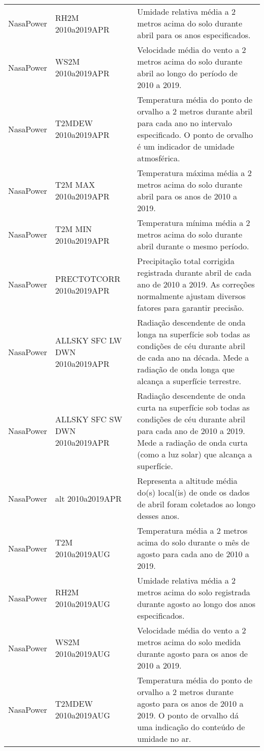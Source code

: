 \begin{longtable}{@{} p{4cm} p{4cm} p{8cm} @{}}
	NasaPower &
	RH2M 2010a2019APR &
	Umidade relativa média a 2 metros acima do solo durante abril para os anos especificados. \\
	NasaPower &
	WS2M 2010a2019APR &
	Velocidade média do vento a 2 metros acima do solo durante abril ao longo do período de 2010 a 2019. \\
	NasaPower &
	T2MDEW 2010a2019APR &
	Temperatura média do ponto de orvalho a 2 metros durante abril para cada ano no intervalo especificado. O ponto de orvalho é um indicador de umidade atmosférica. \\
	NasaPower &
	T2M MAX 2010a2019APR &
	Temperatura máxima média a 2 metros acima do solo durante abril para os anos de 2010 a 2019. \\
	NasaPower &
	T2M MIN 2010a2019APR &
	Temperatura mínima média a 2 metros acima do solo durante abril durante o mesmo período. \\
	NasaPower &
	PRECTOTCORR 2010a2019APR &
	Precipitação total corrigida registrada durante abril de cada ano de 2010 a 2019. As correções normalmente ajustam diversos fatores para garantir precisão. \\
	NasaPower &
	ALLSKY SFC LW DWN 2010a2019APR &
	Radiação descendente de onda longa na superfície sob todas as condições de céu durante abril de cada ano na década. Mede a radiação de onda longa que alcança a superfície terrestre. \\
	NasaPower &
	ALLSKY SFC SW DWN 2010a2019APR &
	Radiação descendente de onda curta na superfície sob todas as condições de céu durante abril para cada ano de 2010 a 2019. Mede a radiação de onda curta (como a luz solar) que alcança a superfície. \\
	NasaPower &
	alt 2010a2019APR &
	Representa a altitude média do(s) local(is) de onde os dados de abril foram coletados ao longo desses anos. \\
	NasaPower &
	T2M 2010a2019AUG &
	Temperatura média a 2 metros acima do solo durante o mês de agosto para cada ano de 2010 a 2019. \\
	NasaPower &
	RH2M 2010a2019AUG &
	Umidade relativa média a 2 metros acima do solo registrada durante agosto ao longo dos anos especificados. \\
	NasaPower &
	WS2M 2010a2019AUG &
	Velocidade média do vento a 2 metros acima do solo medida durante agosto para os anos de 2010 a 2019. \\
	NasaPower &
	T2MDEW 2010a2019AUG &
	Temperatura média do ponto de orvalho a 2 metros durante agosto para os anos de 2010 a 2019. O ponto de orvalho dá uma indicação do conteúdo de umidade no ar. \\

\end{longtable}
